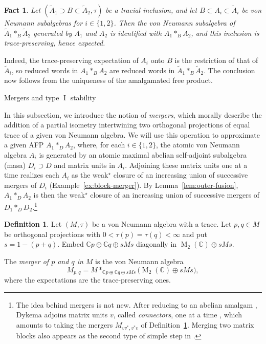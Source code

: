 \documentclass[11pt]{amsart}
\makeatletter
\numberwithin{equation}{section}
\def\subsection{\@startsection{subsection}{2}%
  \z@{.7\linespacing\@plus.7\linespacing}{.3\linespacing}%
  {\normalfont\bfseries}}
\newcommand{\cc}{\mathbb C}
\DeclareMathOperator{\I}{I}
\newcommand{\rM}{\operatorname{M}}
\newtheorem{fact}[The]{Fact}
\theoremstyle{definition}
\newtheorem{Def}[The]{Definition}
\makeatother
\begin{document}
\begin{fact}
    \label{fact:afp-subalgebras}
    Let $(\widetilde A_1\supset B\subset\widetilde A_2,\tau)$ be a tracial inclusion, and let $B\subset A_i\subset\widetilde A_i$ be von Neumann subalgebras for $i\in\{1,2\}$. Then the von Neumann subalgebra of $\widetilde A_1\ast_B\widetilde A_2$ generated by $A_1$ and $A_2$ is identified with $A_1\ast_B A_2$, and this inclusion is trace-preserving, hence expected.
\end{fact}

Indeed, the trace-preserving expectation of $A_i$ onto $B$ is the restriction of that of $\widetilde A_i$, so reduced words in $A_1\ast_BA_2$ are reduced words in $\widetilde A_1\ast_B\widetilde A_2$. The conclusion now follows from the uniqueness of the amalgamated free product.

\subsection{Mergers and type \texorpdfstring{$\I$}{I} stability}

In this subsection, we introduce the notion of \emph{mergers}, which morally describe the addition of a partial isometry intertwining two orthogonal projections of equal trace of a given von Neumann algebra. We will use this operation to approximate a given AFP $A_1\ast_D A_2$, where, for each $i\in\{1,2\}$, the atomic von Neumann algebra $A_i$ is generated by an atomic maximal abelian self-adjoint subalgebra (masa) $D_i\supset D$ and matrix units in $A_i$. Adjoining these matrix units one at a time realizes each $A_i$ as the weak$^\star$ closure of an increasing union of successive mergers of $D_i$ (Example~\ref{ex:block-merger}). By Lemma~\ref{lem:outer-fusion}, $A_1\ast_D A_2$ is then the weak$^\star$ closure of an increasing union of successive mergers of $D_1\ast_D D_2$.\footnote{The idea behind mergers is not new. After reducing to an abelian amalgam \cite[Lemma~5.2]{Dy95}, Dykema adjoins matrix units $v$, called \emph{connectors}, one at a time \cite[pp.~1583--1585]{Dy95}, which amounts to taking the mergers $M_{vv^*,v^*v}$ of Definition~\ref{def:merger}. Merging two matrix blocks also appears as the second type of simple step in \cite[Definition~3.4(2)]{DR13}. 
} 

\begin{Def}
    \label{def:merger}
    Let $(M,\tau)$ be a von Neumann algebra with a trace. Let $p,q\in M$ be orthogonal projections with $0<\tau(p)=\tau(q)<\infty$ and put $s=1-(p+q)$. Embed $\cc p\oplus\cc q\oplus sMs$ diagonally in $\rM_2(\cc)\oplus sMs$.

    The \emph{merger of $p$ and $q$ in $M$} is the von Neumann algebra
    \begin{equation}\label{eq:free-merger}
        M_{p,q}=M\ast_{\cc p\oplus\cc q\oplus sMs}\bigl(\rM_2(\cc)\oplus sMs\bigr),
    \end{equation}
    where the expectations are the trace-preserving ones.
\end{Def}
\end{document}
